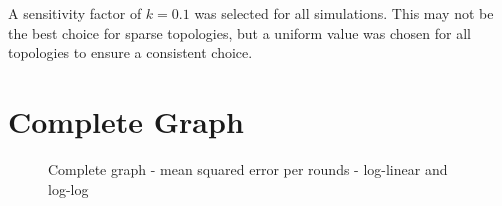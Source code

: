 A sensitivity factor of $k=0.1$ was selected for all simulations. This may not be the best choice for sparse topologies, but a uniform value was chosen for all topologies to ensure a consistent choice.

\section{Complete Graph}\label{sec:completeGraph}
\begin{figure}[!ht]
    \centering
    \hfil
    \caption{Complete graph - mean squared error per rounds - log-linear
    and log-log}
        \label{fig:completegraphMSEperRoundLogLog}
\end{figure}

